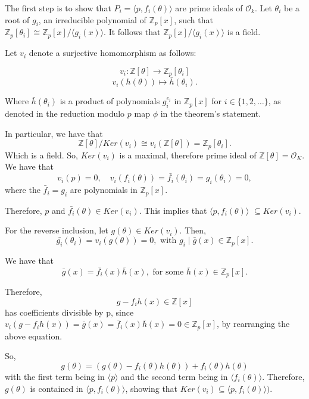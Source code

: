\begin{flushleft}
    \medskip 

    The first step is to show that $P_i = \langle p, f_i(\theta) \rangle$ are prime ideals of $\mathcal{O}_k$. Let $\theta_i$ be a root of $g_i$, an irreducible polynomial of $\mathbb{Z}_p[x]$, such that $\mathbb{Z}_p[\theta_i] \cong \mathbb{Z}_p[x]/
\langle g_i(x) \rangle$. It follows that $\mathbb{Z}_p[x]/\langle g_i(x) \rangle$ is a field. 

    Let $v_i$ denote a surjective homomorphism as follows: 
    
        \[ v_i: \mathbb{Z}[\theta] \to \mathbb{Z}_p[\theta_i]\] \[v_i(h(\theta)) \mapsto \bar{h}(\theta_i). \]
    
    Where $\bar{h}(\theta_i)$ is a product of polynomials $g_i^{e_i}$ in $\mathbb{Z}_p[x]$ for $i \in \{1,2,\dots\}$, as denoted in the reduction 
    modulo $p$ map $\phi$ in the theorem's statement. 

    In particular, we have that 
    \[ 
    \mathbb{Z}[\theta]/Ker(v_i) \cong v_i(\mathbb{Z}[\theta]) = \mathbb{Z}_p[\theta_i].
    \] 
    Which is a field. So, $Ker(v_i)$ is a maximal, therefore prime ideal of $\mathbb{Z}[\theta] = \mathcal{O}_K$. We have that 
    \[
    v_i(p) = 0,\quad v_i(f_i(\theta)) =
    \bar{f_i}(\theta_i) = g_i(\theta_i) = 0,
    \]
    where the $\bar{f}_i = g_i$ are polynomials in $\mathbb{Z}_p[x]$.
    
    Therefore, $p$ and $\bar{f_i}(\theta) \in Ker(v_i)$. This implies that $\langle p, f_i(\theta) \rangle$ $\subseteq Ker(v_i)$.

    For the reverse inclusion, let $g(\theta) \in Ker(v_i)$. Then, 
    \[
    \bar{g_i}(\theta_i) = v_i(g(\theta)) = 0, \text{ with } g_i \mid \bar{g}(x) \in \mathbb{Z}_p[x].
    \]
 
    We have that 
    \[
    \bar{g}(x) = \bar{f_i}(x)\bar{h}(x), \text{ for some } \bar{h}(x) \in \mathbb{Z}_p[x].
    \]

    Therefore, 
    \[ 
    g-f_ih(x) \in \mathbb{Z}[x]
    \] 
    has coefficients divisible by p, since $v_i(g-f_ih(x)) = \bar{g}(x) = \bar{f}_i(x)\bar{h}(x) = 0 \in \mathbb{Z}_p[x]$, by rearranging the 
    above equation. 

    So, 
    \[ 
    g(\theta) = (g(\theta) - f_i(\theta)h(\theta)) + f_i(\theta)h(\theta)
    \]
    with the first term being in $\langle p \rangle$ and the second term being in $\langle f_i(\theta) \rangle$. 
    Therefore, $g(\theta)$ is contained in $\langle p, f_i(\theta) \rangle$, showing that $Ker(v_i) \subseteq \langle p, f_i(\theta) \rangle)$. 


\end{flushleft}
